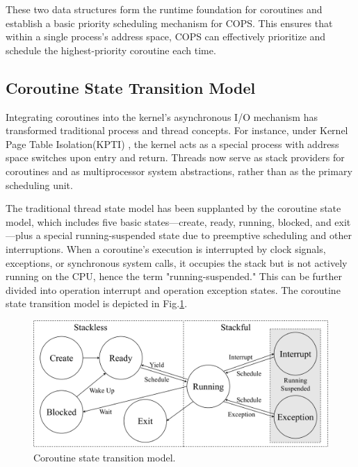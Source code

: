 \documentclass[conference]{IEEEtran}
\begin{document}
These two data structures form the runtime foundation for coroutines and establish a basic priority scheduling mechanism for COPS. This ensures that within a single process's address space, COPS can effectively prioritize and schedule the highest-priority coroutine each time.

\subsection{Coroutine State Transition Model}
\label{section: state-transition}

Integrating coroutines into the kernel's asynchronous I/O mechanism has transformed traditional process and thread concepts. For instance, under Kernel Page Table Isolation(KPTI) \cite{kpti}, the kernel acts as a special process with address space switches upon entry and return. Threads now serve as stack providers for coroutines and as multiprocessor system abstractions, rather than as the primary scheduling unit.

The traditional thread state model has been supplanted by the coroutine state model, which includes five basic states—create, ready, running, blocked, and exit—plus a special running-suspended state due to preemptive scheduling and other interruptions. When a coroutine's execution is interrupted by clock signals, exceptions, or synchronous system calls, it occupies the stack but is not actively running on the CPU, hence the term "running-suspended." This can be further divided into operation interrupt and operation exception states. The coroutine state transition model is depicted in Fig.\ref{fig:state}.

\begin{figure}[tbp]
  \centering
  \includegraphics[width=\linewidth]{assets/cstate.pdf}
  \caption{Coroutine state transition model.}
  \label{fig:state}
  \vspace{-1em}
\end{figure}
\end{document}
